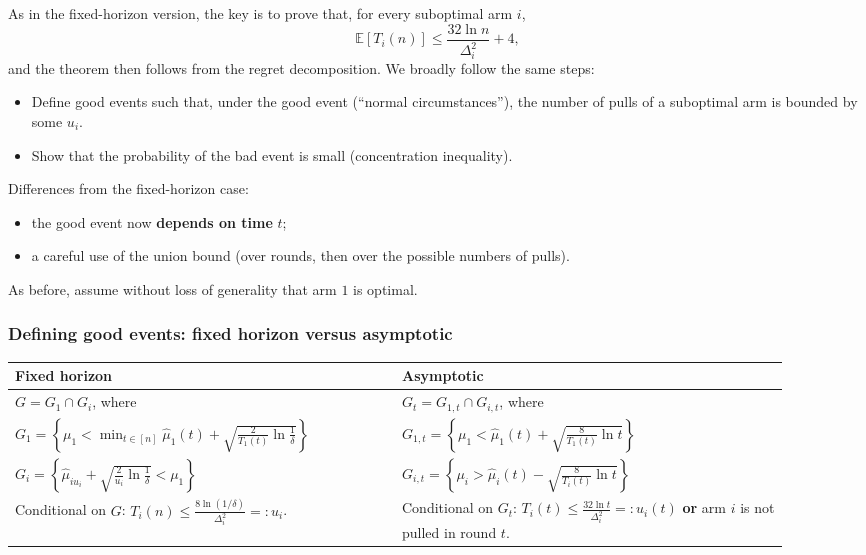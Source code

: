As in the fixed-horizon version, the key is to prove that, for every suboptimal arm $i$,
\[
\mathbb{E}[T_i(n)] \leq \frac{32\ln n}{\Delta_i^2} + 4,
\]
and the theorem then follows from the regret decomposition. We broadly follow the same steps:
\begin{itemize}
    \item Define good events such that, under the good event (``normal circumstances''), the number of pulls of a suboptimal arm is bounded by some $u_i$.
    \item Show that the probability of the bad event is small (concentration inequality).
\end{itemize}
Differences from the fixed-horizon case:
\begin{itemize}
    \item the good event now \textbf{depends on time} $t$;
    \item a careful use of the union bound (over rounds, then over the possible numbers of pulls).
\end{itemize}

As before, assume without loss of generality that arm $1$ is optimal.

\subsubsection*{Defining good events: fixed horizon versus asymptotic}

\begin{center}
\renewcommand{\arraystretch}{1.6}
\begin{tabular}{p{0.45\linewidth}|p{0.45\linewidth}}
\textbf{Fixed horizon} & \textbf{Asymptotic} \\
\hline
$G = G_1 \cap G_i$, where & $G_t = G_{1,t} \cap G_{i,t}$, where \\
$G_1 = \left\{\mu_1 < \min_{t\in[n]} \hat{\mu}_1(t) + \sqrt{\frac{2}{T_1(t)}\ln\frac{1}{\delta}}\right\}$ & $G_{1,t} = \left\{\mu_1 < \hat{\mu}_1(t) + \sqrt{\frac{8}{T_1(t)}\ln t}\right\}$ \\
$G_i = \left\{\hat{\mu}_{iu_i} + \sqrt{\frac{2}{u_i}\ln\frac{1}{\delta}} < \mu_1\right\}$ & $G_{i,t} = \left\{\mu_i > \hat{\mu}_i(t) - \sqrt{\frac{8}{T_i(t)}\ln t}\right\}$ \\
Conditional on $G$: $T_i(n) \leq \frac{8\ln(1/\delta)}{\Delta_i^2} =: u_i$. & Conditional on $G_t$: $T_i(t) \leq \frac{32\ln t}{\Delta_i^2} =: u_i(t)$ \textbf{or} arm $i$ is not pulled in round $t$.
\end{tabular}
\end{center}

